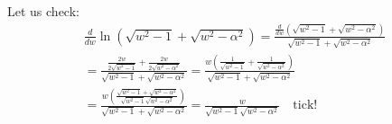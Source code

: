 \documentclass[a4paper]{report}
\begin{document}
Let us check:
\begin{gather*}
\frac{d}{dw} \ln \left( \sqrt{w^2 - 1} + \sqrt{w^2 - \alpha^2} \right) = 
\frac{ \frac{d}{dw} \left( \sqrt{w^2 - 1} + \sqrt{w^2 - \alpha^2} \right) }
     { \sqrt{w^2 - 1} + \sqrt{w^2 - \alpha^2} } \\
= \frac{ \frac{2w}{2 \sqrt{w^2 -1}} + \frac{2w}{2 \sqrt{w^2 - \alpha^2}} }
       { \sqrt{w^2 - 1} + \sqrt{w^2 - \alpha^2} }
= \frac{ w \left( \frac{1}{\sqrt{w^2 -1}} + \frac{1}{\sqrt{w^2 - \alpha^2}} \right) }
       { \sqrt{w^2 - 1} + \sqrt{w^2 - \alpha^2} } \\
= \frac{ w \left( \frac{\sqrt{w^2 - 1} + \sqrt{w^2 - \alpha^2}}
                       {\sqrt{w^2 - 1}\sqrt{w^2 - \alpha^2}}  \right) }
       {\sqrt{w^2 - 1} + \sqrt{w^2 - \alpha^2}}
= \frac{w}{\sqrt{w^2 - 1}\sqrt{w^2 - \alpha^2}} \quad \text{tick!}
\end{gather*}
\end{document}
